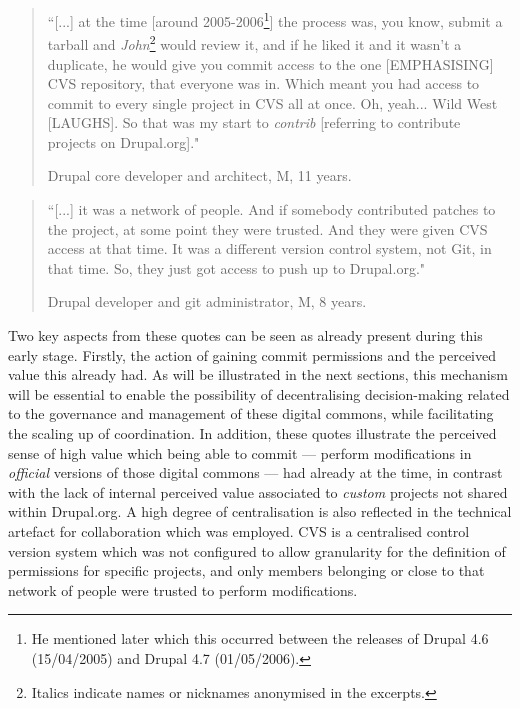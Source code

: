 \begin{quotation}
``[...] at the time [around 2005-2006\footnote{He mentioned later which this occurred between the releases of Drupal 4.6 (15/04/2005) and Drupal 4.7 (01/05/2006).}] the process was, you know, submit a tarball and \textit{John}\footnote{Italics indicate names or nicknames anonymised in the excerpts.} would review it, and if he liked it and it wasn't a duplicate, he would give you commit access to the one [EMPHASISING] CVS repository, that everyone was in. Which meant you had access to commit to every single project in CVS all at once. Oh, yeah... Wild West [LAUGHS]. So that was my start to \textit{contrib} [referring to contribute projects on Drupal.org]."
\begin{flushright}\footnotesize{Drupal core developer and architect, M, 11 years.}\end{flushright}
\end{quotation}

\begin{quotation}
``[...] it was a network of people. And if somebody contributed patches to the project, at some point they were trusted. And they were given CVS access at that time. It was a different version control system, not Git, in that time. So, they just got access to push up to Drupal.org."
\begin{flushright}\footnotesize{Drupal developer and git administrator, M, 8 years.}\end{flushright}
\end{quotation}

Two key aspects from these quotes can be seen as already present during this early stage. Firstly, the action of gaining commit permissions and the perceived value this already had. As will be illustrated in the next sections, this mechanism will be essential to enable the possibility of decentralising decision-making related to the governance and management of these digital commons, while facilitating the scaling up of coordination. In addition, these quotes illustrate the perceived sense of high value which being able to commit --- perform modifications in \textit{official} versions of those digital commons --- had already at the time, in contrast with the lack of internal perceived value associated to \textit{custom} projects not shared within Drupal.org. A high degree of centralisation is also reflected in the technical artefact for collaboration which was employed. CVS is a centralised control version system which was not configured to allow granularity for the definition of permissions for specific projects, and only members belonging or close to that network of people were trusted to perform modifications.

